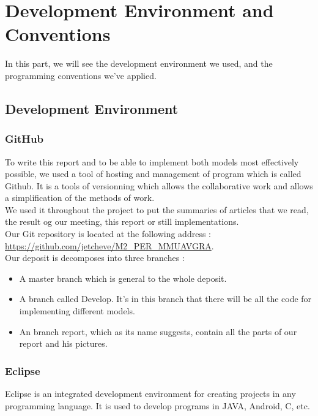 \chapter{Development Environment and Conventions}

In this part, we will see the development environment we used, and the programming conventions we've applied.

\section{Development Environment}

\subsection{GitHub}

To write this report and to be able to implement both models most effectively possible, we used a tool of hosting and management of program which is called Github. It is a tools of versionning which allows the collaborative work and allows a simplification of the methods of work.\\
We used it throughout the project to put the summaries of articles that we read, the result og our meeting, this report or still implementations.\\
Our Git repository is located at the following address : \\
\url{https://github.com/jetcheve/M2\_PER\_MMUAVGRA}.\\

Our deposit is decomposes into three branches :

\begin{itemize}
\item A master branch which is general to the whole deposit.
\item A branch called Develop. It's in this branch that there will be all the code for implementing different models.
\item An branch report, which as its name suggests, contain all the parts of our report and his pictures.
\end{itemize}

\subsection{Eclipse}

Eclipse is an integrated development environment for creating projects in any programming language. It is used to develop programs in JAVA, Android, C, etc.\\

